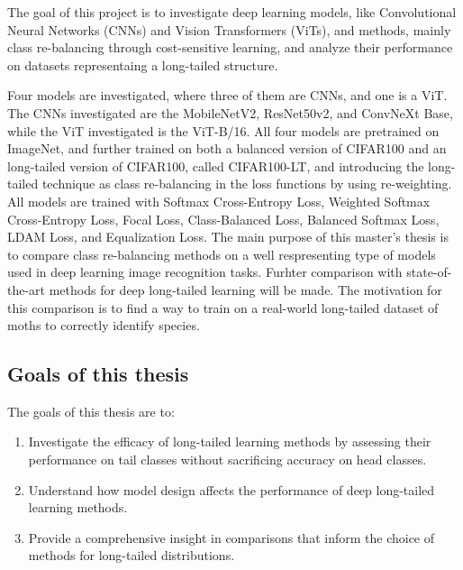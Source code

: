 The goal of this project is to investigate deep learning models, like Convolutional Neural Networks (CNNs) and Vision Transformers (ViTs), and methods, mainly class re-balancing through cost-sensitive learning, and analyze their performance on datasets representaing a long-tailed structure.  

Four models are investigated, where three of them are CNNs, and one is a ViT. The CNNs investigated are the MobileNetV2, ResNet50v2, and ConvNeXt Base, while the ViT investigated is the ViT-B/16. All four models are pretrained on ImageNet, and further trained on both a balanced version of CIFAR100 and an long-tailed version of CIFAR100, called CIFAR100-LT, and introducing the long-tailed technique as class re-balancing in the loss functions by using re-weighting. All models are trained with Softmax Cross-Entropy Loss, Weighted Softmax Cross-Entropy Loss, Focal Loss, Class-Balanced Loss, Balanced Softmax Loss, LDAM Loss, and Equalization Loss. The main purpose of this master's thesis is to compare class re-balancing methods on a well respresenting type of models used in deep learning image recognition tasks. Furhter comparison with state-of-the-art methods for deep long-tailed learning will be made. The motivation for this comparison is to find a way to train on a real-world long-tailed dataset of moths to correctly identify species.




\subsection{Goals of this thesis}
\label{sec:goals}
The goals of this thesis are to:

\begin{enumerate}
    \item Investigate the efficacy of long-tailed learning methods by assessing their performance on tail classes without sacrificing accuracy on head classes. 
    \item Understand how model design affects the performance of deep long-tailed learning methods.
    \item Provide a comprehensive insight in comparisons that inform the choice of methods for long-tailed distributions.
\end{enumerate}

